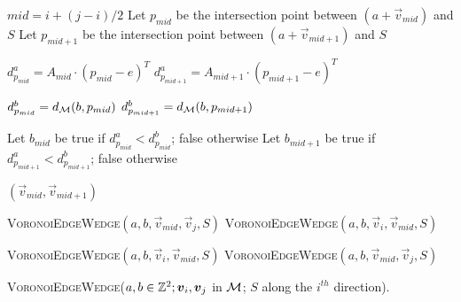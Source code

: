 \documentclass{llncs}
\begin{document}
\begin{algorithm}
\footnotesize
{
   $mid  = i + (j-i)/2$\;
   Let $p_{mid}$  be the intersection point between $(a +
   \vec{v}_{mid})$ and $S$\;
  Let $p_{mid+1}$  be the intersection point between $(a +
   \vec{v}_{mid+1})$ and $S$\;


   $d^a_{p_{mid}} = A_{mid}\cdot (p_{mid}-e)^T$\;
   $d^a_{p_{mid+1}} = A_{mid+1}\cdot (p_{mid+1}-e)^T$\;


   $d^b_{p_{mid}} = d_{\mathcal{M}}(b, p_{mid})$\;
   $d^b_{p_{mid+1}} = d_{\mathcal{M}}(b,p_{mid+1})$\;

   Let $b_{mid}$ be true if $d^a_{p_{mid}} < d^b_{p_{mid}}$; false otherwise\;
   Let $b_{mid+1}$ be true if $d^a_{p_{mid+1}} < d^b_{p_{mid+1}}$; false otherwise\;


    { \Return $(\vec{v}_{mid},\vec{v}_{mid+1})$\; }

{
{
  \Return \textsc{VoronoiEdgeWedge}$(a,b,\vec{v}_{mid}, \vec{v}_{j}, S)$\;
}
{
  \Return \textsc{VoronoiEdgeWedge}$(a,b,\vec{v}_{i}, \vec{v}_{mid}, S)$\;
}

}
{
{
  \Return \textsc{VoronoiEdgeWedge}$(a,b,\vec{v}_{i}, \vec{v}_{mid}, S)$\;
}
{
  \Return \textsc{VoronoiEdgeWedge}$(a,b,\vec{v}_{mid}, \vec{v}_{j}, S)$\;
}

}

}
  \caption{\textsc{VoronoiEdgeWedge}($a,b\in\Z^2; \vec{v}_i,\vec{v}_j$
    in $\mathcal{M}$; $S$ along the $i^{th}$ direction).\label{alg:chamedgew}}
\end{algorithm}
\end{document}
